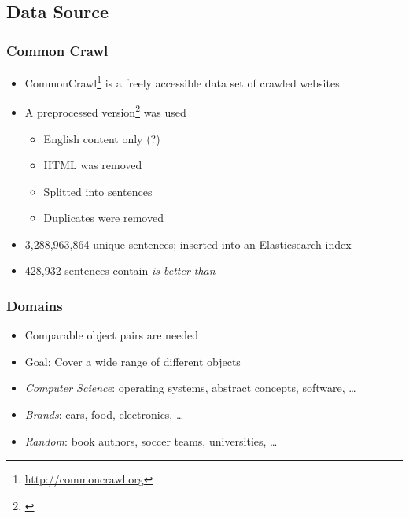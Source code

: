 \documentclass[11pt,aspectratio=169]{beamer}
\begin{document}
    \subsection{Data Source}
    \frame{\subsectionpage}
    \begin{frame}
        \frametitle{Common Crawl}
        \begin{itemize}
            \item CommonCrawl\footnote{\url{http://commoncrawl.org}} is a freely accessible data set of crawled websites
            \item A preprocessed version\footnote{\cite{Panchenko:2017aa}} was used
            \begin{itemize}
                \item English content only (?)
                \item HTML was removed
                \item Splitted into sentences
                \item Duplicates were removed
            \end{itemize}
            \item 3,288,963,864 unique sentences; inserted into an Elasticsearch index
            \item 428,932 sentences contain \emph{is better than}
        \end{itemize}

    \end{frame}

    \begin{frame}
        \frametitle{Domains}
        \begin{itemize}
            \item Comparable object pairs are needed
            \item Goal: Cover a wide range of different objects
            \item \emph{Computer Science}: operating systems, abstract concepts, software, \ldots
            \item \emph{Brands}: cars, food, electronics, \ldots
            \item \emph{Random}: book authors, soccer teams, universities, \ldots

        \end{itemize}
    \end{frame}
\end{document}
